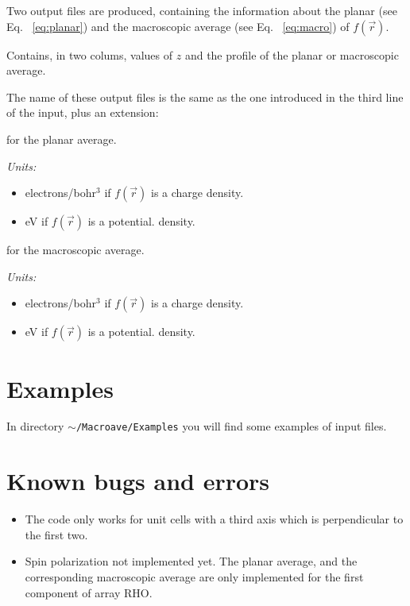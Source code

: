 
 Two output files are produced, containing the information
 about the planar (see Eq. ~\ref{eq:planar}) and the
 macroscopic average (see Eq. ~\ref{eq:macro}) of
 $f \left( \vec{r} \right)$.

 Contains, in two colums, values of $z$ and the profile
 of the planar or macroscopic average.

 The name of these output files is the same as the one
 introduced in the third line of the input, plus an extension:

 \begin{description}
 \itemsep 10pt
 \parsep 0pt

 \item[.PAV] for the planar average.

      {\it Units:}
      \begin{itemize}
         \item electrons/bohr$^3$ if $f \left( \vec{r} \right)$ is a charge
               density.
         \item eV if $f \left( \vec{r} \right)$ is a potential.
               density.
      \end{itemize}

 \item[.MAV] for the macroscopic average.

      {\it Units:}
      \begin{itemize}
         \item electrons/bohr$^3$ if $f \left( \vec{r} \right)$ is a charge
               density.
         \item eV if $f \left( \vec{r} \right)$ is a potential.
               density.
      \end{itemize}

 \end{description}


 \section{Examples}

 In directory {\tt $\sim$/Macroave/Examples} you will find some
 examples of input files.

 \section{Known bugs and errors}

 \begin{itemize}
    \item The code only works for unit cells with a third axis which is perpendicular to the first two.
    \item Spin polarization not implemented yet.
          The planar average, and the corresponding macroscopic average
          are only implemented for the first component of array RHO.
 \end{itemize}


